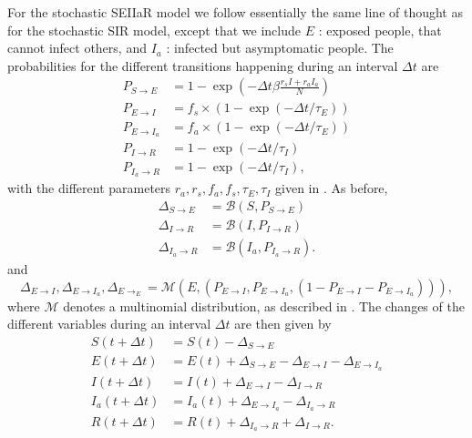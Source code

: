 For the stochastic SEIIaR model we follow essentially the same line of thought as for the stochastic SIR model, except that we include $E$ : exposed people, that cannot infect others, and $I_a$ : infected but asymptomatic people. The probabilities for the different transitions happening during an interval $\Delta t$ are
\begin{subequations}
	\begin{align}
		P_{S\to E} &= 1- \exp{\left(-\Delta t \beta \frac{r_s I + r_a I_a}{N}\right)} \\
		P_{E\to I} &=  f_s \times (1- \exp{(-\Delta t /\tau_E)}) \\
		P_{E\to I_a} &= f_a \times (1- \exp{(-\Delta t/\tau_E)}) \\
		P_{I\to R} &= 1- \exp{(-\Delta t /\tau_I)} \\
		P_{I_a\to R} &= 1- \exp{(-\Delta t/\tau_I)}, 
	\end{align}
\end{subequations}
with the different parameters $r_a,r_s,f_a,f_s,\tau_E,\tau_I$ given in \cite{sheet}. As before, 
\begin{subequations}
	\begin{align*}
		\Delta_{S\to E  } &= \mathcal{B}(S,P_{S \to E}) \\
		\Delta_{I\to R  } &= \mathcal{B}(I,P_{I \to R}) \\
		\Delta_{I_a\to R} &= \mathcal{B}(I_a,P_{I_a \to R}).
	\end{align*}
\end{subequations}
and 
\begin{equation}
	\Delta_{E \to I}, \Delta_{E \to I_a}, \Delta_{E \to _E} = \mathcal{M}(E,(P_{E\to I},P_{E\to I_a}, (1- P_{E\to I} - P_{E\to I_a}))),
\end{equation}
where $\mathcal{M}$ denotes a multinomial distribution, as described in \cite{sheet}. The changes of the different variables during an interval $\Delta t$ are then given by
\begin{subequations}
	\begin{align}
		S(t + \Delta t) &= S(t) - \Delta_{S\to E} \\
		E(t + \Delta t) &= E(t) + \Delta_{S\to E} - \Delta_{E\to I} - \Delta_{E \to I_a} \\
		I(t + \Delta t) &= I(t) + \Delta_{E\to I} - \Delta_{I\to R} \\
		I_a(t + \Delta t) &= I_a(t) + \Delta_{E\to I_a} - \Delta_{I_a\to R} \\
		R(t + \Delta t) &= R(t) + \Delta_{I_a \to R} + \Delta_{I \to R}. \\
	\end{align}
\end{subequations}